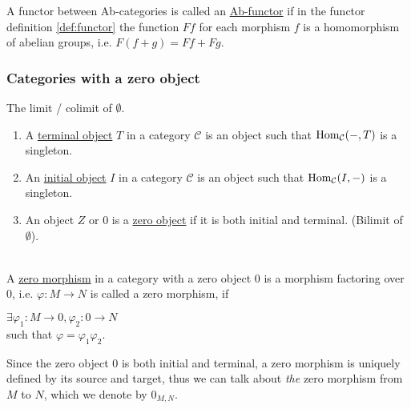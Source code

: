\begin{definition}[Ab-functor]
A functor between Ab-categories is called an \ul{Ab-functor} if in the functor definition \ref{def:functor} the function $Ff$ for each
morphism $f$ is a homomorphism of abelian groups, i.e. $F(f+g) = Ff + Fg$.
\end{definition}

\subsubsection{Categories with a zero object}

\begin{remark}\label{def:init_term_zero_object}
The limit / colimit of $\emptyset$.
\renewcommand{\labelenumi}{(\theenumi)}
\begin{enumerate}
\item A \ul{terminal object} $T$ in a category $\mathcal{C}$ is an object such that $\textup{Hom}_{\mathcal{C}}(-,T)$ is a singleton.
\item An \ul{initial object} $I$ in a category $\mathcal{C}$ is an object such that $\textup{Hom}_{\mathcal{C}}(I,-)$ is a singleton.
\item An object $Z$ or $0$ is a \ul{zero object} if it is both initial and terminal. (Bilimit of $\emptyset$).
\end{enumerate}
\end{remark}

\begin{definition}\label{def:zero_morphism}\phantom{}\\
A \ul{zero morphism} in a category with a zero object $0$ is a morphism factoring over $0$, i.e. $\varphi : M \rightarrow N$ is called a zero
morphism, if\\
\begin{minipage}{.35\textwidth}
\end{minipage}
\begin{minipage}{.65\textwidth}
$\exists \varphi_{1} : M \rightarrow 0, \varphi_{2} : 0 \rightarrow N$\\
such that $\varphi = \varphi_{1}\varphi_{2}$.
\end{minipage}
Since the zero object $0$ is both initial and terminal, a zero morphism is uniquely defined by its source and target, thus we can
talk about \textit{the} zero morphism from $M$ to $N$, which we denote by $0_{M,N}$.
\end{definition}

